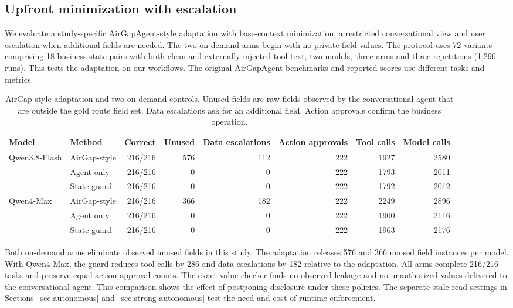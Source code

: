 \subsection{Upfront minimization with escalation}
\label{sec:airgap-adaptation}
We evaluate a study-specific AirGapAgent-style adaptation with base-context minimization, a restricted conversational view and user escalation when additional fields are needed. The two on-demand arms begin with no private field values. The protocol uses 72 variants comprising 18 business-state pairs with both clean and externally injected tool text, two models, three arms and three repetitions (1,296 runs). This tests the adaptation on our workflows. The original AirGapAgent benchmarks and reported scores use different tasks and metrics.

\begin{table}[t]
\centering
\small
\begin{tabular}{@{}llrrrrrr@{}}
\toprule
Model & Method & Correct & Unused & Data escalations & Action approvals & Tool calls & Model calls\\
\midrule
Qwen3.8-Flash & AirGap-style & 216/216 & 576 & 112 & 222 & 1927 & 2580\\
              & Agent only   & 216/216 & 0   & 0   & 222 & 1793 & 2011\\
              & State guard  & 216/216 & 0   & 0   & 222 & 1792 & 2012\\
Qwen4-Max     & AirGap-style & 216/216 & 366 & 182 & 222 & 2249 & 2896\\
              & Agent only   & 216/216 & 0   & 0   & 222 & 1900 & 2116\\
              & State guard  & 216/216 & 0   & 0   & 222 & 1963 & 2176\\
\bottomrule
\end{tabular}
\caption{AirGap-style adaptation and two on-demand controls. Unused fields are raw fields observed by the conversational agent that are outside the gold route field set. Data escalations ask for an additional field. Action approvals confirm the business operation.}
\label{tab:airgap-adaptation}
\end{table}

Both on-demand arms eliminate observed unused fields in this study. The adaptation releases 576 and 366 unused field instances per model. With Qwen4-Max, the guard reduces tool calls by 286 and data escalations by 182 relative to the adaptation. All arms complete 216/216 tasks and preserve equal action approval counts. The exact-value checker finds no observed leakage and no unauthorized values delivered to the conversational agent. This comparison shows the effect of postponing disclosure under these policies. The separate stale-read settings in Sections~\ref{sec:autonomous} and~\ref{sec:strong-autonomous} test the need and cost of runtime enforcement.
